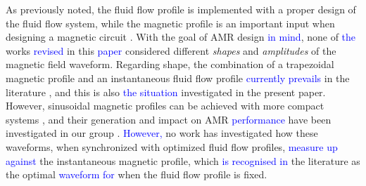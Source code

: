 \documentclass[referee]{svjour3}
\begin{document}
As previously noted, the fluid flow profile is implemented with a proper design of the fluid flow system, while the magnetic profile is an important input when designing a magnetic circuit \cite{bib:oh13-air}. With the goal of AMR design \textcolor{blue}{in mind}, none of \textcolor{blue}{the} works \textcolor{blue}{revised} in this \textcolor{blue}{paper} considered different \emph{shapes} and \emph{amplitudes} of the magnetic field waveform. Regarding shape, the combination of a trapezoidal magnetic profile and an instantaneous fluid flow profile \textcolor{blue}{currently prevails} in the literature \cite{bib:bjoerk11_amr,bib:benedict16_desig,bib:park17-devel-k-k}, and this is also \textcolor{blue}{the situation} investigated in the present paper. However, sinusoidal magnetic profiles can be achieved with more compact systems \cite{bib:trevizoli16_pump}, and their generation and impact on AMR \textcolor{blue}{performance} have been investigated in  our group \cite{FORTKAMP201787,bib:fortkamp20-desig}. \textcolor{blue}{However,} no work has investigated how these waveforms, when synchronized with optimized fluid flow profiles, \textcolor{blue}{measure up against} the instantaneous magnetic profile, which \textcolor{blue}{is recognised in} the literature as the optimal \textcolor{blue}{waveform for} when the fluid flow profile is fixed.
\end{document}
